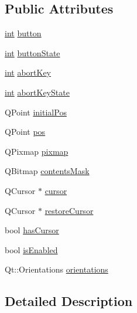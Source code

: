 \subsection*{Public Attributes}
\begin{DoxyCompactItemize}
\item 
\hyperlink{ioapi_8h_a787fa3cf048117ba7123753c1e74fcd6}{int} \hyperlink{class_qwt_panner_1_1_private_data_a06c4ad392ffa91ef232d713263abad21}{button}
\item 
\hyperlink{ioapi_8h_a787fa3cf048117ba7123753c1e74fcd6}{int} \hyperlink{class_qwt_panner_1_1_private_data_aa8d4438f9f88ac36c340a80fc7e4ec92}{button\-State}
\item 
\hyperlink{ioapi_8h_a787fa3cf048117ba7123753c1e74fcd6}{int} \hyperlink{class_qwt_panner_1_1_private_data_a955c0fbb8578a8f9314497d3adf345c3}{abort\-Key}
\item 
\hyperlink{ioapi_8h_a787fa3cf048117ba7123753c1e74fcd6}{int} \hyperlink{class_qwt_panner_1_1_private_data_ad967c965e66ffce21d5539e6877ea3e8}{abort\-Key\-State}
\item 
Q\-Point \hyperlink{class_qwt_panner_1_1_private_data_a5d50af61147132e2987947776ec30d82}{initial\-Pos}
\item 
Q\-Point \hyperlink{class_qwt_panner_1_1_private_data_a61ffc8ce3105d412d4e7b6791720246f}{pos}
\item 
Q\-Pixmap \hyperlink{class_qwt_panner_1_1_private_data_ae8f0aab7d4396ae08d02d766f8d71409}{pixmap}
\item 
Q\-Bitmap \hyperlink{class_qwt_panner_1_1_private_data_ada6e4d3f592a774fb2d57c8f65e731cb}{contents\-Mask}
\item 
Q\-Cursor $\ast$ \hyperlink{class_qwt_panner_1_1_private_data_a7ed04561a57f6a416a8bf6ffe9c773d6}{cursor}
\item 
Q\-Cursor $\ast$ \hyperlink{class_qwt_panner_1_1_private_data_a5a37eb3f45a9e887ed24a6d2654069d6}{restore\-Cursor}
\item 
bool \hyperlink{class_qwt_panner_1_1_private_data_a6af0d50e5b0e949fc80ff95b563a44e4}{has\-Cursor}
\item 
bool \hyperlink{class_qwt_panner_1_1_private_data_a4ed759d92567c9c2788c2a754273a6d5}{is\-Enabled}
\item 
Qt\-::\-Orientations \hyperlink{class_qwt_panner_1_1_private_data_a1144c44ccc130527f57f2e6aa7e022e1}{orientations}
\end{DoxyCompactItemize}


\subsection{Detailed Description}


